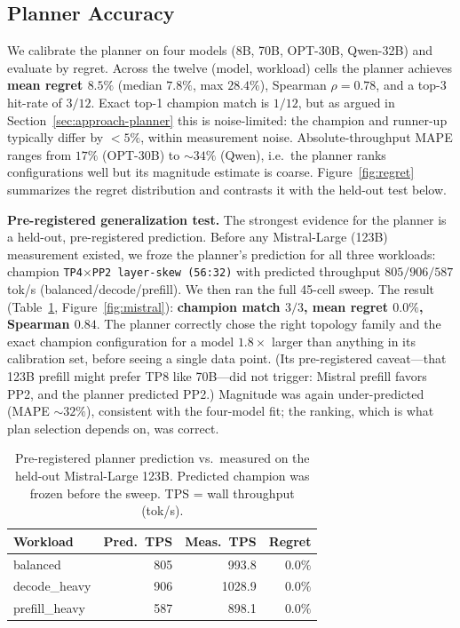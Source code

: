 \documentclass[twocolumn]{article}
\begin{document}
\subsection{Planner Accuracy}
\label{sec:eval-planner}

We calibrate the planner on four models (8B, 70B, OPT-30B, Qwen-32B) and evaluate by regret. Across the twelve (model, workload) cells the planner achieves \textbf{mean regret $8.5\%$} (median $7.8\%$, max $28.4\%$), Spearman $\rho{=}0.78$, and a top-3 hit-rate of $3/12$. Exact top-1 champion match is $1/12$, but as argued in Section~\ref{sec:approach-planner} this is noise-limited: the champion and runner-up typically differ by $<5\%$, within measurement noise. Absolute-throughput MAPE ranges from $17\%$ (OPT-30B) to $\sim\!34\%$ (Qwen), i.e.\ the planner ranks configurations well but its magnitude estimate is coarse. Figure~\ref{fig:regret} summarizes the regret distribution and contrasts it with the held-out test below.

\textbf{Pre-registered generalization test.} The strongest evidence for the planner is a held-out, pre-registered prediction. Before any Mistral-Large (123B) measurement existed, we froze the planner's prediction for all three workloads: champion \texttt{TP4$\times$PP2 layer-skew (56:32)} with predicted throughput $805/906/587$ tok/s (balanced/decode/prefill). We then ran the full 45-cell sweep. The result (Table~\ref{tab:mistral}, Figure~\ref{fig:mistral}): \textbf{champion match $3/3$, mean regret $0.0\%$, Spearman $0.84$}. The planner correctly chose the right topology family and the exact champion configuration for a model $1.8\times$ larger than anything in its calibration set, before seeing a single data point. (Its pre-registered caveat---that 123B prefill might prefer TP8 like 70B---did not trigger: Mistral prefill favors PP2, and the planner predicted PP2.) Magnitude was again under-predicted (MAPE $\sim\!32\%$), consistent with the four-model fit; the ranking, which is what plan selection depends on, was correct.

\begin{table}[t]
\centering
\small
\setlength{\tabcolsep}{4pt}
\caption{Pre-registered planner prediction vs.\ measured on the held-out Mistral-Large 123B. Predicted champion was frozen before the sweep. TPS = wall throughput (tok/s).}
\label{tab:mistral}
\begin{tabular}{lrrr}
\toprule
Workload & Pred.\ TPS & Meas.\ TPS & Regret \\
\midrule
balanced       & 805 & 993.8  & $0.0\%$ \\
decode\_heavy  & 906 & 1028.9 & $0.0\%$ \\
prefill\_heavy & 587 & 898.1  & $0.0\%$ \\
\bottomrule
\end{tabular}
\end{table}
\end{document}
